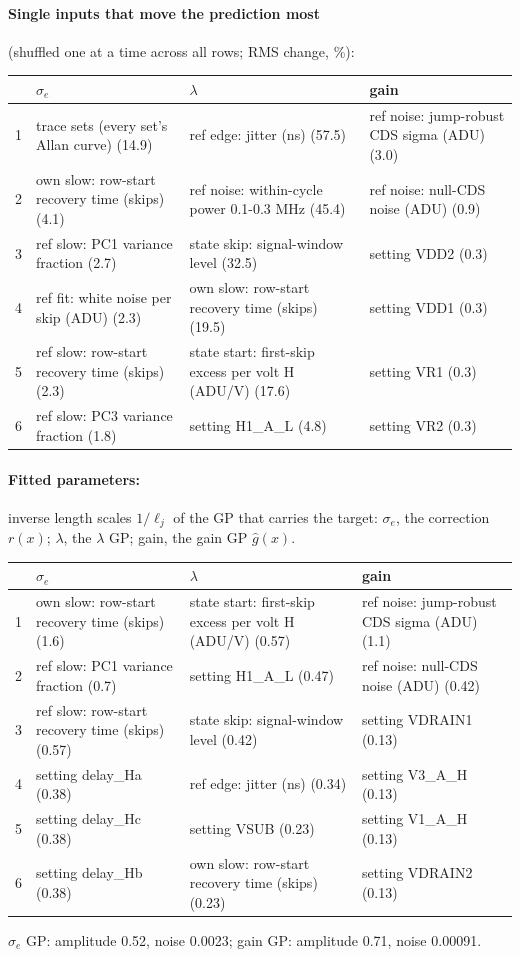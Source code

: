 \paragraph{Single inputs that move the prediction most} (shuffled one at a time across all rows; RMS change, \%):
\begin{center}\footnotesize
\begin{tabular}{rp{}p{}p{}}
\toprule
 & $\sigma_e$ & $\lambda$ & gain \\
\midrule
1 & trace sets (every set's Allan curve) (14.9) & ref edge: jitter (ns) (57.5) & ref noise: jump-robust CDS sigma (ADU) (3.0) \\
2 & own slow: row-start recovery time (skips) (4.1) & ref noise: within-cycle power 0.1-0.3 MHz (45.4) & ref noise: null-CDS noise (ADU) (0.9) \\
3 & ref slow: PC1 variance fraction (2.7) & state skip: signal-window level (32.5) & setting VDD2 (0.3) \\
4 & ref fit: white noise per skip (ADU) (2.3) & own slow: row-start recovery time (skips) (19.5) & setting VDD1 (0.3) \\
5 & ref slow: row-start recovery time (skips) (2.3) & state start: first-skip excess per volt H (ADU/V) (17.6) & setting VR1 (0.3) \\
6 & ref slow: PC3 variance fraction (1.8) & setting H1\_A\_L (4.8) & setting VR2 (0.3) \\
\bottomrule
\end{tabular}
\end{center}
\paragraph{Fitted parameters:} inverse length scales $1/\ell_j$ of the GP that carries the target: $\sigma_e$, the correction $r(x)$; $\lambda$, the $\lambda$ GP; gain, the gain GP $\hat g(x)$.
\begin{center}\footnotesize
\begin{tabular}{rp{}p{}p{}}
\toprule
 & $\sigma_e$ & $\lambda$ & gain \\
\midrule
1 & own slow: row-start recovery time (skips) (1.6) & state start: first-skip excess per volt H (ADU/V) (0.57) & ref noise: jump-robust CDS sigma (ADU) (1.1) \\
2 & ref slow: PC1 variance fraction (0.7) & setting H1\_A\_L (0.47) & ref noise: null-CDS noise (ADU) (0.42) \\
3 & ref slow: row-start recovery time (skips) (0.57) & state skip: signal-window level (0.42) & setting VDRAIN1 (0.13) \\
4 & setting delay\_Ha (0.38) & ref edge: jitter (ns) (0.34) & setting V3\_A\_H (0.13) \\
5 & setting delay\_Hc (0.38) & setting VSUB (0.23) & setting V1\_A\_H (0.13) \\
6 & setting delay\_Hb (0.38) & own slow: row-start recovery time (skips) (0.23) & setting VDRAIN2 (0.13) \\
\bottomrule
\end{tabular}
\end{center}
{\footnotesize $\sigma_e$ GP: amplitude 0.52, noise 0.0023; gain GP: amplitude 0.71, noise 0.00091.}
